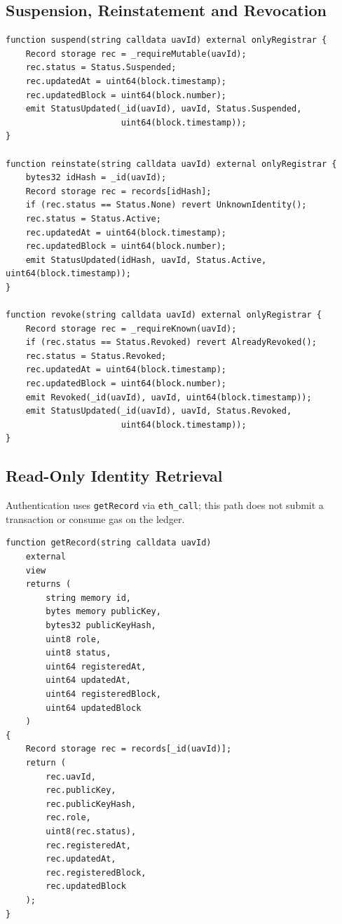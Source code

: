 \subsection{Suspension, Reinstatement and Revocation}
\label{app:contract-revocation}

\begin{lstlisting}[style=solidity,caption={Status transitions (lines 126--152)},label=lst:registry-revoke]
function suspend(string calldata uavId) external onlyRegistrar {
    Record storage rec = _requireMutable(uavId);
    rec.status = Status.Suspended;
    rec.updatedAt = uint64(block.timestamp);
    rec.updatedBlock = uint64(block.number);
    emit StatusUpdated(_id(uavId), uavId, Status.Suspended,
                       uint64(block.timestamp));
}

function reinstate(string calldata uavId) external onlyRegistrar {
    bytes32 idHash = _id(uavId);
    Record storage rec = records[idHash];
    if (rec.status == Status.None) revert UnknownIdentity();
    rec.status = Status.Active;
    rec.updatedAt = uint64(block.timestamp);
    rec.updatedBlock = uint64(block.number);
    emit StatusUpdated(idHash, uavId, Status.Active, uint64(block.timestamp));
}

function revoke(string calldata uavId) external onlyRegistrar {
    Record storage rec = _requireKnown(uavId);
    if (rec.status == Status.Revoked) revert AlreadyRevoked();
    rec.status = Status.Revoked;
    rec.updatedAt = uint64(block.timestamp);
    rec.updatedBlock = uint64(block.number);
    emit Revoked(_id(uavId), uavId, uint64(block.timestamp));
    emit StatusUpdated(_id(uavId), uavId, Status.Revoked,
                       uint64(block.timestamp));
}
\end{lstlisting}

\subsection{Read-Only Identity Retrieval}
\label{app:contract-getrecord}

Authentication uses \texttt{getRecord} via \texttt{eth\_call}; this path does not submit a transaction or consume gas on the ledger.

\begin{lstlisting}[style=solidity,caption={Read-only registry lookup (lines 160--187)},label=lst:registry-getrecord]
function getRecord(string calldata uavId)
    external
    view
    returns (
        string memory id,
        bytes memory publicKey,
        bytes32 publicKeyHash,
        uint8 role,
        uint8 status,
        uint64 registeredAt,
        uint64 updatedAt,
        uint64 registeredBlock,
        uint64 updatedBlock
    )
{
    Record storage rec = records[_id(uavId)];
    return (
        rec.uavId,
        rec.publicKey,
        rec.publicKeyHash,
        rec.role,
        uint8(rec.status),
        rec.registeredAt,
        rec.updatedAt,
        rec.registeredBlock,
        rec.updatedBlock
    );
}
\end{lstlisting}

